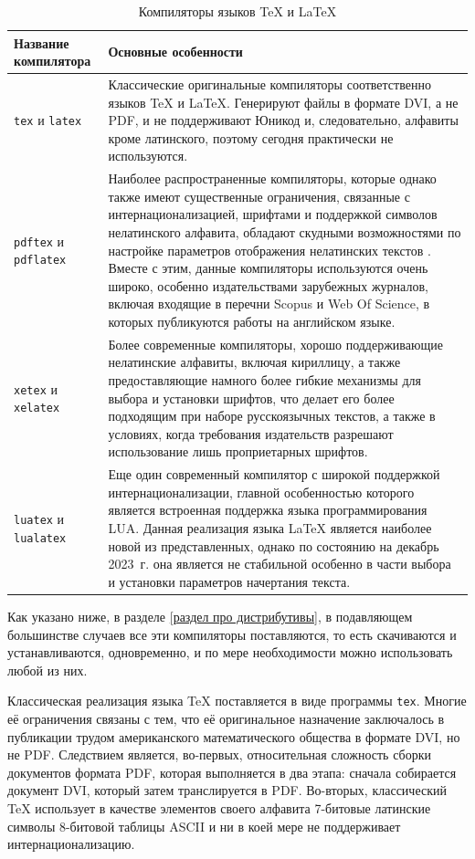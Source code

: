 \documentclass[workbook, draught]{fefudoc}
\begin{document}
\begin{table}[ht]\small
\centering
\caption{Компиляторы языков \TeX{} и \LaTeX{}}
\label{таблица компиляторов}
\begin{tabularx}{\textwidth}{|l|X|}
\hline
\textbf{Название компилятора} & \textbf{Основные особенности} \\ \hline
\texttt{tex} и \texttt{latex} & Классические оригинальные компиляторы соответственно языков \TeX{} и \LaTeX{}. Генерируют файлы в формате DVI, а не PDF, и не поддерживают Юникод и, следовательно, алфавиты кроме латинского, поэтому сегодня практически не используются. \\ \hline
\texttt{pdftex} и \texttt{pdflatex} & Наиболее распространенные компиляторы, которые однако также имеют существенные ограничения, связанные с интернационализацией, шрифтами и поддержкой символов нелатинского алфавита, обладают скудными возможностями по настройке параметров отображения нелатинских текстов \cite{ПособиеLatex}. Вместе с этим, данные компиляторы используются очень широко, особенно издательствами зарубежных журналов, включая входящие в перечни Scopus и Web Of Science, в которых публикуются работы на английском языке. \\ \hline
\texttt{xetex} и \texttt{xelatex} & Более современные компиляторы, хорошо поддерживающие нелатинские алфавиты, включая кириллицу, а также предоставляющие намного более гибкие механизмы для выбора и установки шрифтов, что делает его более подходящим при наборе русскоязычных текстов, а также в условиях, когда требования издательств разрешают использование лишь проприетарных шрифтов. \\ \hline
\texttt{luatex} и \texttt{lualatex} & Еще один современный компилятор с широкой поддержкой интернационализации, главной особенностью которого является встроенная поддержка языка программирования LUA. Данная реализация языка \LaTeX{} является наиболее новой из представленных, однако по состоянию на декабрь 2023~г. она является не стабильной особенно в части выбора и установки параметров начертания текста.\\ \hline
\end{tabularx}
\end{table}

Как указано ниже, в разделе \ref{раздел про дистрибутивы}, в подавляющем большинстве случаев все эти компиляторы поставляются, то есть скачиваются и устанавливаются, одновременно, и по мере необходимости можно использовать любой из них.

Классическая реализация языка \TeX{} поставляется в виде программы \texttt{tex}.
Многие её ограничения связаны с тем, что её оригинальное назначение заключалось в публикации трудом американского математического общества в формате DVI, но не PDF.
Следствием является, во-первых, относительная сложность сборки документов формата PDF, которая выполняется в два этапа: сначала собирается документ DVI, который затем транслируется в PDF.
Во-вторых, классический \TeX{} использует в качестве элементов своего алфавита 7-битовые латинские символы 8-битовой таблицы ASCII и ни в коей мере не поддерживает интернационализацию.
\end{document}

